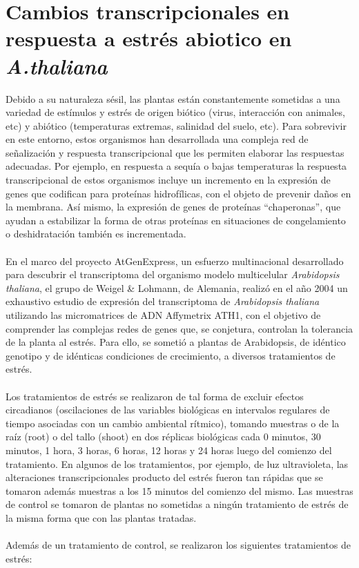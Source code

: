 \section{Cambios transcripcionales en respuesta a estrés abiotico en \textit{A.thaliana}}
\label{sec:wiegel}
Debido a su naturaleza sésil, las plantas están constantemente sometidas a una variedad de estímulos y estrés de origen biótico (virus, interacción con animales, etc) y abiótico (temperaturas extremas, salinidad del suelo, etc). Para sobrevivir en este entorno, estos organismos han desarrollada una compleja red de señalización y respuesta transcripcional que les permiten elaborar las respuestas adecuadas. Por ejemplo, en respuesta a sequía o bajas temperaturas la respuesta transcripcional de estos organismos incluye un incremento en la expresión de genes que codifican para proteínas hidrofílicas, con el objeto de prevenir daños en la membrana. Así mismo, la expresión de genes de proteínas ``chaperonas'', que ayudan a estabilizar la forma de otras proteínas
en situaciones de congelamiento o deshidratación también es incrementada.\\\\
En el marco del proyecto AtGenExpress, un esfuerzo multinacional desarrollado para descubrir el transcriptoma del organismo modelo multicelular \textit{Arabidopsis thaliana}, el grupo de Weigel \& Lohmann, de Alemania, realizó en el año 2004 un exhaustivo estudio de expresión del transcriptoma de \textit{Arabidopsis thaliana} utilizando las micromatrices de ADN Affymetrix ATH1, con el objetivo de comprender las complejas redes de genes que, se conjetura, controlan la tolerancia de la planta al estrés. Para ello, se sometió a plantas de Arabidopsis, de idéntico genotipo y de idénticas condiciones de crecimiento, a diversos tratamientos de estrés.\\\\
Los tratamientos de estrés se realizaron de tal forma de excluir efectos circadianos (oscilaciones de las variables biológicas en intervalos regulares de tiempo asociadas con un cambio ambiental rítmico), tomando muestras o de la raíz (root) o del tallo (shoot) en dos réplicas biológicas cada 0 minutos, 30 minutos, 1 hora, 3 horas, 6 horas, 12 horas y 24 horas luego del comienzo del tratamiento. En algunos de los tratamientos, por ejemplo, de luz ultravioleta, las alteraciones transcripcionales producto del estrés fueron tan rápidas que se tomaron además muestras a los 15 minutos del comienzo  del mismo. Las muestras de control se tomaron de plantas no sometidas a ningún tratamiento de estrés de la misma forma que con las plantas tratadas.\\\\
Además de un tratamiento de control, se realizaron los siguientes tratamientos de estrés:
